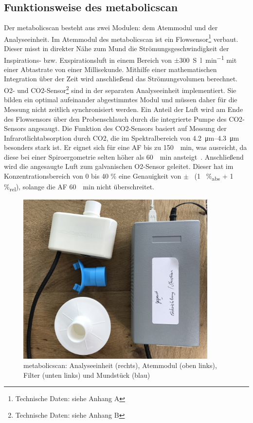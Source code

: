 \subsection{Funktionsweise des metabolicscan}
%
Der metabolicscan besteht aus zwei Modulen: dem Atemmodul und der Analyseeinheit. Im Atemmodul des metabolicscan ist ein Flowsensor\footnote{Technische Daten: siehe Anhang A} verbaut. Dieser misst in direkter Nähe zum Mund die Strömungsgeschwindigkeit der Inspirations- bzw. Exspirationsluft in einem Bereich von $\pm$\SI{300}{S\litre\per\minute} mit einer Abtastrate von einer Millisekunde. Mithilfe einer mathematischen Integration über der Zeit wird anschließend das Strömungsvolumen berechnet. \gls{O2}- und \gls{CO2}-Sensor\footnote{Technische Daten: siehe Anhang B} sind in der separaten Analyseeinheit implementiert. Sie bilden ein optimal aufeinander abgestimmtes Modul und müssen daher für die Messung nicht zeitlich synchronisiert werden. Ein Anteil der Luft wird am Ende des Flowsensors über den Probenschlauch durch die integrierte Pumpe des \gls{CO2}-Sensors angesaugt. Die Funktion des \gls{CO2}-Sensors basiert auf Messung der Infrarotlichtabsorption durch \gls{CO2}, die im Spektralbereich von \SIrange{4,2}{4,3}{\micro\metre} besonders stark ist. Er eignet sich für eine \gls{AF} bis zu \SI{150}{\per\minute}, was ausreicht, da diese bei einer Spiroergometrie selten höher als \SI{60}{\per\minute} ansteigt~\cite{Hollmann.2006}. Anschließend wird die angesaugte Luft zum galvanischen \gls{O2}-Sensor geleitet. Dieser hat im Konzentrationsbereich von 0 bis 40 \% eine Genauigkeit von $\pm$~ (1~ \%\textsubscript{abs} + 1 \%\textsubscript{rel}), solange die \gls{AF} \SI{60}{\per\minute} nicht überschreitet.
%
\begin{figure}[H]
	\centering
	\includegraphics[width=100mm]{Bilder/mbs.jpg}
	\caption[metabolicscan: Analyseeinheit, Atemmodul, Filter und Mundstück]{metabolicscan: Analyseeinheit (rechts), Atemmodul (oben links), Filter (unten links) und Mundstück (blau)}
	\label{pic:pic9}
\end{figure}
%
